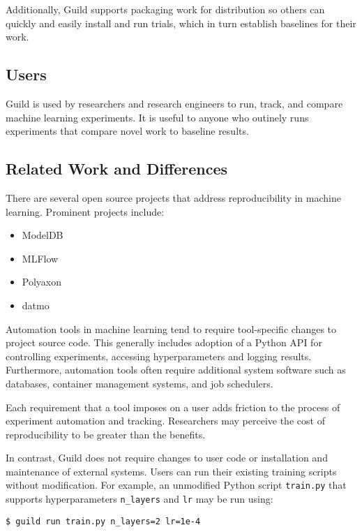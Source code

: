 \documentclass{article}
\begin{document}
Additionally, Guild supports packaging work for distribution so others
can quickly and easily install and run trials, which in turn establish
baselines for their work.

\subsection{Users}

Guild is used by researchers and research engineers to run, track, and
compare machine learning experiments. It is useful to anyone who
outinely runs experiments that compare novel work to baseline results.

\subsection{Related Work and Differences}

There are several open source projects that address reproducibility in
machine learning. Prominent projects include:

\begin{itemize}[noitemsep, topsep=0pt, partopsep=0pt]
\item ModelDB \cite{modeldb}
\item MLFlow \cite{mlflow}
\item Polyaxon \cite{polyaxon}
\item datmo \cite{datmo}
\end{itemize}

Automation tools in machine learning tend to require tool-specific
changes to project source code. This generally includes adoption of a
Python API for controlling experiments, accessing hyperparameters and
logging results. Furthermore, automation tools often require
additional system software such as databases, container management
systems, and job schedulers.

Each requirement that a tool imposes on a user adds friction to the
process of experiment automation and tracking. Researchers may
perceive the cost of reproducibility to be greater than the benefits.

In contrast, Guild does not require changes to user code or
installation and maintenance of external systems. Users can run their
existing training scripts without modification. For example, an
unmodified Python script \texttt{train.py} that supports
hyperparameters \texttt{n\_layers} and \texttt{lr} may be run using:

{\footnotesize
\begin{verbatim}
$ guild run train.py n_layers=2 lr=1e-4
\end{verbatim}}
\end{document}
